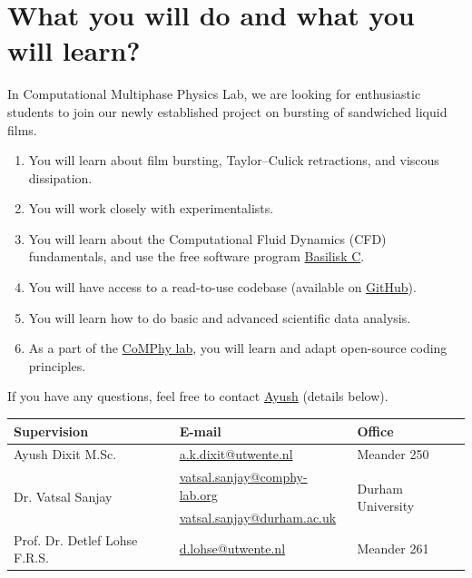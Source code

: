\documentclass[a4paper,10pt]{article}
\begin{document}
\section*{What you will do and what you will learn?}
In Computational Multiphase Physics Lab, we are looking for enthusiastic students to join our newly established project on bursting of sandwiched liquid films.

\begin{enumerate}
\item You will learn about film bursting, Taylor--Culick retractions, and viscous dissipation. 
\item You will work closely with experimentalists. 
\item You will learn about the Computational Fluid Dynamics (CFD) fundamentals, and use the free software program \href{http://basilisk.fr}{Basilisk C}.
\item You will have access to a read-to-use codebase (available on \href{https://github.com/comphy-lab/bubbleinSheet}{GitHub}).
\item You will learn how to do basic and advanced scientific data analysis.
\item As a part of the \href{https://comphy-lab.org}{CoMPhy lab}, you will learn and adapt open-source coding principles. 
\end{enumerate}

If you have any questions, feel free to contact \href{mailto:a.k.dixit@utwente.nl}{Ayush} (details below).
\begin{center}
\begin{tabular}{|l|l|l|}
\hline \textbf{Supervision} & \textbf{E-mail} & \textbf{Office} \\
\hline Ayush Dixit M.Sc. & \href{mailto:a.k.dixit@utwente.nl}{a.k.dixit@utwente.nl} & Meander 250 \\
\hline \multirow{2}{*}{Dr. Vatsal Sanjay} & \href{mailto:vatsal.sanjay@comphy-lab.org}{vatsal.sanjay@comphy-lab.org} & \multirow{2}{*}{Durham University} \\
& \href{mailto:vatsal.sanjay@durham.ac.uk}{vatsal.sanjay@durham.ac.uk} & \\
\hline Prof. Dr. Detlef Lohse F.R.S. & \href{mailto:d.lohse@utwente.nl}{d.lohse@utwente.nl} & Meander 261  \\
\hline
\end{tabular}
\end{center}

\printbibliography
\end{document}
